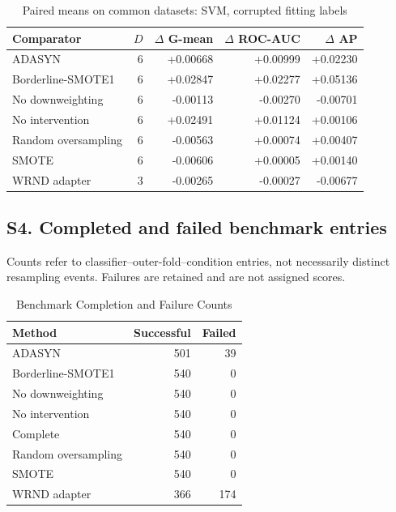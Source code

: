 \begin{table}[htbp]
\caption{Paired means on common datasets: SVM, corrupted fitting labels}
\centering\small
\begin{tabular}{lrrrr}
\hline
Comparator & $D$ & $\Delta$ G-mean & $\Delta$ ROC-AUC & $\Delta$ AP\\
\hline
ADASYN & 6 & +0.00668 & +0.00999 & +0.02230 \\
Borderline-SMOTE1 & 6 & +0.02847 & +0.02277 & +0.05136 \\
No downweighting & 6 & -0.00113 & -0.00270 & -0.00701 \\
No intervention & 6 & +0.02491 & +0.01124 & +0.00106 \\
Random oversampling & 6 & -0.00563 & +0.00074 & +0.00407 \\
SMOTE & 6 & -0.00606 & +0.00005 & +0.00140 \\
WRND adapter & 3 & -0.00265 & -0.00027 & -0.00677 \\
\hline
\end{tabular}
\end{table}
\clearpage
\subsection*{S4. Completed and failed benchmark entries}
Counts refer to classifier--outer-fold--condition entries, not necessarily distinct resampling events. Failures are retained and are not assigned scores.
\begin{table}[htbp]
\caption{Benchmark Completion and Failure Counts}
\centering\begin{tabular}{lrr}
\hline
Method & Successful & Failed\\
\hline
ADASYN & 501 & 39 \\
Borderline-SMOTE1 & 540 & 0 \\
No downweighting & 540 & 0 \\
No intervention & 540 & 0 \\
Complete & 540 & 0 \\
Random oversampling & 540 & 0 \\
SMOTE & 540 & 0 \\
WRND adapter & 366 & 174 \\
\hline
\end{tabular}\end{table}

